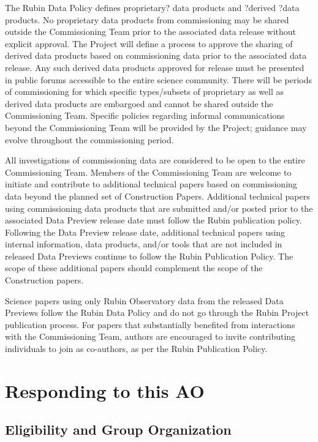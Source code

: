 \documentclass[SE,authoryear,toc]{lsstdoc}
\begin{document}
The Rubin Data Policy defines proprietary? data products and ?derived ?data products. No proprietary data products from commissioning may be shared outside the Commissioning Team prior to the associated data release without explicit approval. The Project will define a process to approve the sharing of derived data products based on commissioning data prior to the associated data release. Any such derived data products approved for release must be presented in public forums accessible to the entire science community. There will be periods of commissioning for which specific types/subsets of proprietary as well as derived data products are embargoed and cannot be shared outside the Commissioning Team. Specific policies regarding informal communications beyond the Commissioning Team will be provided by the Project; guidance may evolve throughout the commissioning period. 

All investigations of commissioning data are considered to be open to the entire Commissioning Team. Members of the Commissioning Team are welcome to initiate and contribute to additional technical papers based on commissioning data beyond the planned set of Construction Papers. Additional technical papers using commissioning data products that are submitted and/or posted prior to the associated Data Preview release date must follow the Rubin publication policy. Following the Data Preview release date, additional technical papers using internal information, data products, and/or tools that are not included in released Data Previews continue to follow the Rubin Publication Policy. The scope of these additional papers should complement the scope of the Construction papers.

Science papers using only Rubin Observatory data from the released Data Previews follow the Rubin Data Policy and do not go through the Rubin Project publication process. For papers that substantially benefited from interactions with the Commissioning Team, authors are encouraged to invite contributing individuals to join as co-authors, as per the Rubin Publication Policy.

\section{Responding to this AO}

\subsection{Eligibility and Group Organization}
\end{document}
